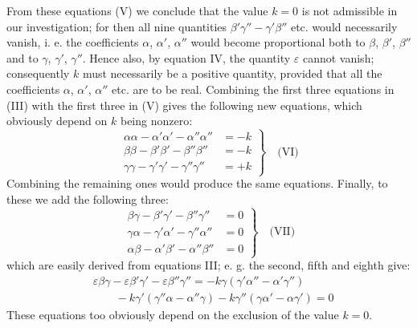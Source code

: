 From these equations (V) we conclude that the value $k=0$ is not admissible in our investigation; for then all nine quantities $\beta'\gamma''-\gamma'\beta''$ etc. would necessarily vanish, i. e. the coefficients $\alpha$, $\alpha'$, $\alpha''$ would become proportional both to $\beta$, $\beta'$, $\beta''$ and to $\gamma$, $\gamma'$, $\gamma''$. Hence also, by equation IV, the quantity $\varepsilon$ cannot vanish; consequently $k$ must necessarily be a positive quantity, provided that all the coefficients $\alpha$, $\alpha'$, $\alpha''$ etc. are to be real. Combining the first three equations in (III) with the first three in (V) gives the following new equations, which obviously depend on $k$ being nonzero:
\[
\left.\begin{aligned}
\alpha\alpha-\alpha'\alpha'-\alpha''\alpha''&=-k\\[5pt]
\beta\beta-\beta'\beta'-\beta''\beta''&=-k\\[5pt]
\gamma\gamma-\gamma'\gamma'-\gamma''\gamma''&=+k
\end{aligned}\right\}\quad\text{(VI)}
\]
Combining the remaining ones would produce the same equations. Finally, to these we add the following three:
\[
\left.\begin{aligned}
\beta\gamma-\beta'\gamma'-\beta''\gamma''&=0\\[5pt]
\gamma\alpha-\gamma'\alpha'-\gamma''\alpha''&=0\\[5pt]
\alpha\beta-\alpha'\beta'-\alpha''\beta''&=0
\end{aligned}\right\}\quad\text{(VII)}
\]
which are easily derived from equations III; e. g. the second, fifth and eighth give:
\[
\begin{aligned}
&\varepsilon\beta\gamma-\varepsilon\beta'\gamma'-\varepsilon\beta''\gamma''=-k\gamma(\gamma'\alpha''-\alpha'\gamma'')\\[6pt]
&\qquad{}-k\gamma'(\gamma''\alpha-\alpha''\gamma)-k\gamma''(\gamma\alpha'-\alpha\gamma')=0
\end{aligned}
\]
These equations too obviously depend on the exclusion of the value $k=0$.

